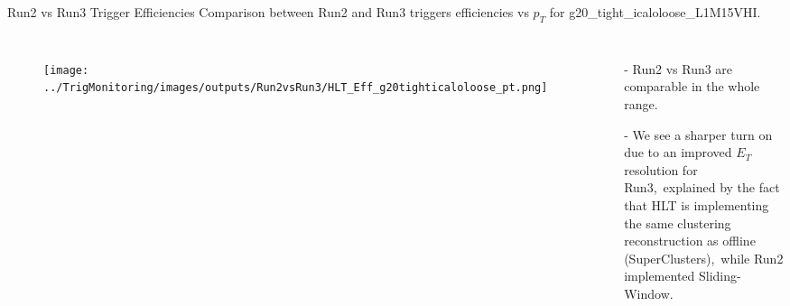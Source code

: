 \documentclass[aspectratio=1610,8pt]{beamer}					%
\begin{document}
\begin{frame}{Run2 vs Run3 Trigger Efficiencies}
    Comparison between Run2 and Run3 triggers efficiencies vs $p_T$ for g20\_tight\_icaloloose\_L1M15VHI.
    \begin{columns}
        \begin{figure}[h!]
            \centering
            \texttt{[image: ../TrigMonitoring/images/outputs/Run2vsRun3/HLT\_Eff\_g20tighticaloloose\_pt.png]}
        \end{figure}
        \begin{itemize}
            \item [-]
                Run2 vs Run3 are comparable in the whole range.
            \item [-]
                We see a sharper turn on due to an improved $E_T$ resolution for Run3,\
                explained by the fact that HLT is implementing the same clustering reconstruction as offline (SuperClusters),\
                while Run2 implemented Sliding-Window.
        \end{itemize}
    \end{columns}
    

\end{frame}
\end{document}
